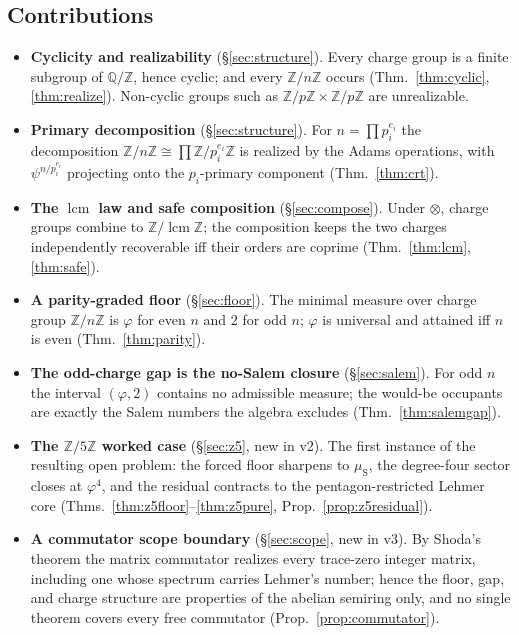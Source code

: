 \documentclass[11pt]{article}
\theoremstyle{definition}
\theoremstyle{remark}
\newcommand{\Z}{\mathbb{Z}}
\newcommand{\Q}{\mathbb{Q}}
\newcommand{\Adams}[1]{\psi^{#1}}
\newcommand{\gold}{\varphi}
\newcommand{\tens}{\otimes}
\newcommand{\Zmod}[1]{\Z/#1\Z}
\newcommand{\muS}{\mu_{\mathrm{S}}}
\begin{document}
\subsection{Contributions}
\begin{itemize}[nosep]
  \item \textbf{Cyclicity and realizability} (\S\ref{sec:structure}). Every charge group is a
        finite subgroup of $\Q/\Z$, hence cyclic; and every $\Zmod n$ occurs (Thm.~\ref{thm:cyclic},
        \ref{thm:realize}). Non-cyclic groups such as $\Zmod p\times\Zmod p$ are unrealizable.
  \item \textbf{Primary decomposition} (\S\ref{sec:structure}). For $n=\prod p_i^{e_i}$ the
        decomposition $\Zmod n\cong\prod\Zmod{p_i^{e_i}}$ is realized by the Adams operations,
        with $\Adams{n/p_i^{e_i}}$ projecting onto the $p_i$-primary component (Thm.~\ref{thm:crt}).
  \item \textbf{The $\operatorname{lcm}$ law and safe composition} (\S\ref{sec:compose}).
        Under $\tens$, charge groups combine to $\Zmod{\operatorname{lcm}}$; the composition
        keeps the two charges independently recoverable iff their orders are coprime
        (Thm.~\ref{thm:lcm}, \ref{thm:safe}).
  \item \textbf{A parity-graded floor} (\S\ref{sec:floor}). The minimal measure over charge
        group $\Zmod n$ is $\gold$ for even $n$ and $2$ for odd $n$; $\gold$ is universal and
        attained iff $n$ is even (Thm.~\ref{thm:parity}).
  \item \textbf{The odd-charge gap is the no-Salem closure} (\S\ref{sec:salem}). For odd $n$
        the interval $(\gold,2)$ contains no admissible measure; the would-be occupants are
        exactly the Salem numbers the algebra excludes (Thm.~\ref{thm:salemgap}).
  \item \textbf{The $\Zmod5$ worked case} (\S\ref{sec:z5}, new in v2). The first instance of
        the resulting open problem: the forced floor sharpens to $\muS$, the degree-four sector
        closes at $\gold^{4}$, and the residual contracts to the pentagon-restricted Lehmer
        core (Thms.~\ref{thm:z5floor}--\ref{thm:z5pure}, Prop.~\ref{prop:z5residual}).
  \item \textbf{A commutator scope boundary} (\S\ref{sec:scope}, new in v3). By Shoda's theorem
        the matrix commutator realizes every trace-zero integer matrix, including one whose
        spectrum carries Lehmer's number; hence the floor, gap, and charge structure are
        properties of the abelian semiring only, and no single theorem covers every free
        commutator (Prop.~\ref{prop:commutator}).
\end{itemize}
\end{document}
